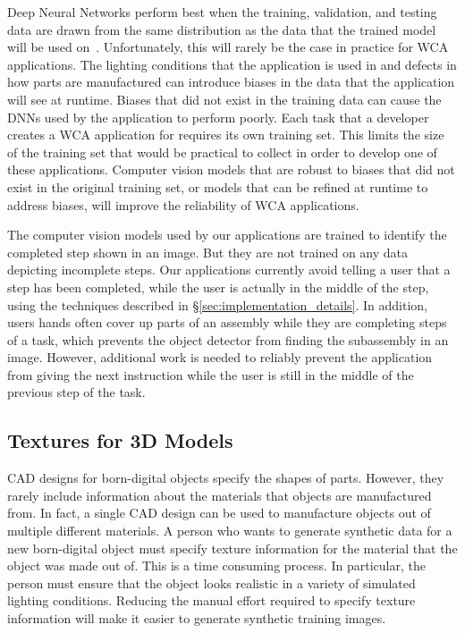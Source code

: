 Deep Neural Networks perform best when the training, validation, and testing
data are drawn from the same distribution as the data that the trained model
will be used on~\cite{pmlr-v97-recht19a}.
Unfortunately, this will rarely be the case in practice for WCA applications.
The lighting conditions that the application is used in and defects in how parts
are manufactured can introduce biases in the data that the application will see
at runtime.
Biases that did not exist in the training data can cause the DNNs used by the
application to perform poorly.
Each task that a developer creates a WCA application for requires its own
training set.
This limits the size of the training set that would be practical to collect in
order to develop one of these applications.
Computer vision models that are robust to biases that did not exist in the
original training set, or models that can be refined at runtime to address
biases, will improve the reliability of WCA applications.

The computer vision models used by our applications are trained to identify the
completed step shown in an image.
But they are not trained on any data depicting incomplete steps.
Our applications currently avoid telling a user that a step has been completed,
while the user is actually in the middle of the step, using the techniques
described in \S\ref{sec:implementation_details}.
In addition, users hands often cover up parts of an assembly while they
are completing steps of a task, which prevents the object detector from finding
the subassembly in an image.
However, additional work is needed to reliably prevent the application from
giving the next instruction while the user is still in the middle of the
previous step of the task.

\subsection{Textures for 3D Models}

CAD designs for born-digital objects specify the shapes of parts.
However, they rarely include information about the materials that objects are
manufactured from.
In fact, a single CAD design can be used to manufacture objects out of multiple
different materials.
A person who wants to generate synthetic data for a new born-digital object must
specify texture information for the material that the object was made out of.
This is a time consuming process.
In particular, the person must ensure that the object looks realistic in a
variety of simulated lighting conditions.
Reducing the manual effort required to specify texture information will make it
easier to generate synthetic training images.

